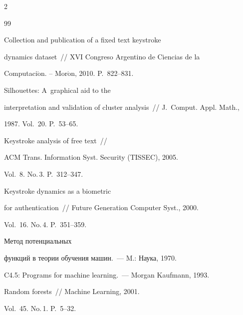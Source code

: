 \begin{multicols}{2}
{{\begin{thebibliography}{99}

 Collection and publication of a fixed text keystroke

dynamics dataset~// XVI Congreso Argentino de Ciencias de la

Computaci$\acute{\mbox{o}}$n. -- Mor$\acute{\mbox{o}}$n, 2010. P.~822--831.




 Silhouettes: A~graphical aid to the

interpretation and validation of cluster analysis~// J.~Comput. Appl. Math., 

1987. Vol.~20. P.~53--65.




 Keystroke analysis of free text~//

ACM Trans. Information Syst. Security (TISSEC), 2005.

Vol.~8. No.\,3. P.~312--347.




 Keystroke dynamics as a biometric

for authentication~// Future Generation Computer Syst., 2000.

Vol.~16. No.\,4. P.~351--359.




 Метод потенциальных

функций в теории обучения машин.~--- M.: Наука, 1970.




 C4.5: Programs for machine learning.~--- Morgan Kaufmann, 1993.



\label{end\stat}




 Random forests~// Machine Learning, 2001.

Vol.~45. No.\,1. P.~5--32.

\end{thebibliography}

} }



\end{multicols}

